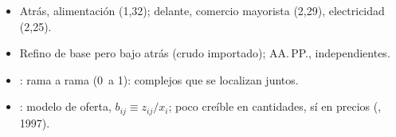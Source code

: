 \documentclass{article}
\begin{document}
\begin{columnas}
\begin{itemize}
  \begin{itemize}
  \item Atrás, alimentación (1,32); delante, comercio mayorista (2,29), electricidad (2,25).
  \item Refino de base pero bajo atrás (crudo importado); AA.\,PP., independientes.
  \end{itemize}
\end{itemize}
\begin{itemize}
\item {}: rama a rama (0~a 1): complejos que se localizan juntos.
\item {}: modelo de oferta, $b_{ij}\equiv z_{ij}/x_i$; poco creíble en cantidades, sí en precios (, 1997).
\end{itemize}


\end{columnas}
\end{document}
